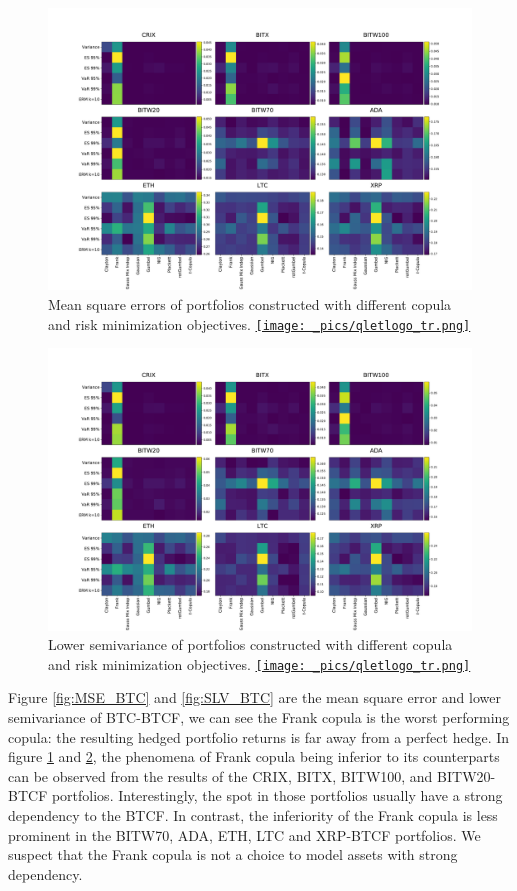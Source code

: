 \begin{figure}[ht]
    \centering
    \includegraphics[width=\textwidth]{_pics/MSE_other.pdf}
  \caption{Mean square errors of portfolios constructed with different copula and risk minimization objectives.
  \href{http://www.quantlet.com/}{\texttt{[image: \_pics/qletlogo\_tr.png]}} }
\label{fig:MSE_other}
\end{figure}

\begin{figure}[ht]
    \centering
    \includegraphics[width=\textwidth]{_pics/semiLowerVariance_other.pdf}
  \caption{Lower semivariance of portfolios constructed with different copula and risk minimization objectives.
  \href{http://www.quantlet.com/}{\texttt{[image: \_pics/qletlogo\_tr.png]}} }
\label{fig:SLV_other}
\end{figure}


Figure \ref{fig:MSE_BTC} and \ref{fig:SLV_BTC} are the mean square error and lower semivariance of BTC-BTCF, we can see the Frank copula is the worst performing copula:
the resulting hedged portfolio returns is far away from a perfect hedge.
In figure \ref{fig:MSE_other} and \ref{fig:SLV_other}, the phenomena of Frank copula being inferior to its counterparts can be observed from the results of the CRIX, BITX, BITW100, and BITW20-BTCF portfolios.
Interestingly, the spot in those portfolios usually have a strong dependency to the BTCF.
In contrast, the inferiority of the Frank copula is less prominent in the BITW70, ADA, ETH, LTC and XRP-BTCF portfolios.
We suspect that the Frank copula is not a choice to model assets with strong dependency.  \medskip

